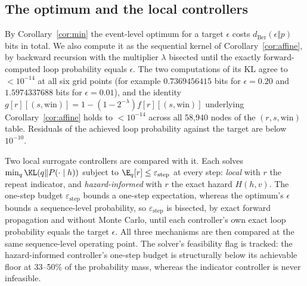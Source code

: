 \subsection{The optimum and the local controllers}
\label{ssec:oracle}
By Corollary~\ref{cor:min} the event-level optimum for a target $\epsilon$ costs $d_{\mathrm{Ber}}(\epsilon\Vert p)$ bits in total. We also compute it as the sequential kernel of Corollary~\ref{cor:affine}, by backward recursion with the multiplier $\lambda$ bisected until the exactly forward-computed loop probability equals $\epsilon$. The two computations of its KL agree to $<10^{-14}$ at all six grid points (for example $0.7369456415$ bits for $\epsilon{=}0.20$ and $1.5974337688$ bits for $\epsilon{=}0.01$), and the identity $g[r][(s,\text{win})]=1-(1-2^{-\lambda})f[r][(s,\text{win})]$ underlying Corollary~\ref{cor:affine} holds to $<10^{-14}$ across all 58{,}940 nodes of the $(r,s,\text{win})$ table. Residuals of the achieved loop probability against the target are below $10^{-10}$.

Two local surrogate controllers are compared with it. Each solves $\min_q\KL(q\Vert P(\cdot\mid h))$ subject to $\E_q[r]\le\varepsilon_{\text{step}}$ at every step: \emph{local} with $r$ the repeat indicator, and \emph{hazard-informed} with $r$ the exact hazard $H(h,v)$. The one-step budget $\varepsilon_{\text{step}}$ bounds a one-step expectation, whereas the optimum's $\epsilon$ bounds a sequence-level probability, so $\varepsilon_{\text{step}}$ is bisected, by exact forward propagation and without Monte Carlo, until each controller's own exact loop probability equals the target $\epsilon$. All three mechanisms are then compared at the same sequence-level operating point. The solver's feasibility flag is tracked: the hazard-informed controller's one-step budget is structurally below its achievable floor at 33--50\% of the probability mass, whereas the indicator controller is never infeasible.

